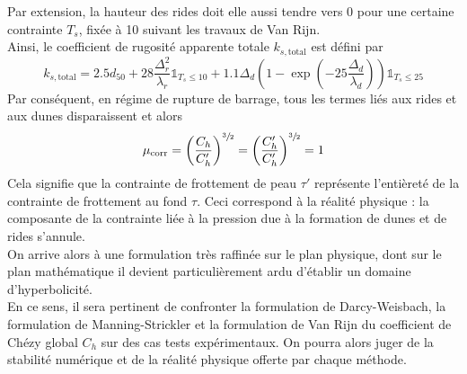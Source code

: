 \documentclass[11pt, a4paper, oneside]{report}
\begin{document}
Par extension, la hauteur des rides doit elle aussi tendre vers 0 pour une certaine contrainte $T_s$, fixée à 10 suivant les travaux de Van Rijn. \\
Ainsi, le coefficient de rugosité apparente totale $k_{s, \text{total}}$ est défini par
\begin{equation}
    k_{s, \text{total}} = 2.5 d_{50} + 28 \frac{\Delta_r^2}{\lambda_r} \mathds{1}_{T_s \leq 10} + 1.1 \Delta_d \left( 1 - \exp \left( -25 \frac{\Delta_d}{\lambda_d} \right) \right) \mathds{1}_{T_s \leq 25}
\end{equation}
Par conséquent, en régime de rupture de barrage, tous les termes liés aux rides et aux dunes disparaissent et alors
\begin{equation}
    \mu_\text{corr} = \left( \frac{C_h}{C_h'} \right)^{\sfrac{3}{2}} = \left( \frac{C_h'}{C_h'} \right)^{\sfrac{3}{2}} = 1
\end{equation}
Cela signifie que la contrainte de frottement de peau $\tau'$ représente l'entièreté de la contrainte de frottement au fond $\tau$. Ceci correspond à la réalité physique : la composante de la contrainte liée à la pression due à la formation de dunes et de rides s'annule. \\
On arrive alors à une formulation très raffinée sur le plan physique, dont sur le plan mathématique il devient particulièrement ardu d'établir un domaine d'hyperbolicité. \\
En ce sens, il sera pertinent de confronter la formulation de Darcy-Weisbach, la formulation de Manning-Strickler et la formulation de Van Rijn du coefficient de Chézy global $C_h$ sur des cas tests expérimentaux. On pourra alors juger de la stabilité numérique et de la réalité physique offerte par chaque méthode. \\
\end{document}
